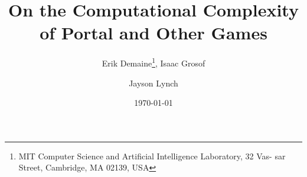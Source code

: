 \documentclass[11pt,twoside]{article}
\makeatletter
\gdef\xxx{\@ifnextchar[\xxx@lab\xxx@nolab}
\makeatother
\begin{document}
\title{On the Computational Complexity of Portal and Other Games}
\author{Erik Demaine\thanks{MIT Computer Science and Artificial Intelligence Laboratory, 32 Vas-
sar Street, Cambridge, MA 02139, USA}, Isaac Grosof\footnotemark[1]  \and Jayson Lynch\footnotemark[1]}
\date{\today}
\maketitle




%
%
%

%
%

%

%









{}
\end{document}

